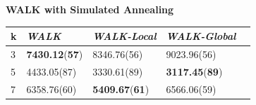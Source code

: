 \documentclass[12pt,a4paper,twoside]{scrartcl}
\numberwithin{equation}{section}
\begin{document}
\clearpage
\textbf{WALK with Simulated Annealing}\\
\begin{table}[H]
\begin{center}
    \begin{tabular}{|l|l|l|l|p{3cm}|}
\hline 
    k &\emph{WALK}&\emph{WALK-Local}&\emph{WALK-Global} \\ \hline      
    3 &\textbf{7430.12}(\textbf{57})&	8346.76(56)	&9023.96(56)  \\ \hline
    5&4433.05(87)	&3330.61(89)	&\textbf{3117.45}(\textbf{89}) \\ \hline
    7&6358.76(60)	&\textbf{5409.67}(\textbf{61})&	6566.06(59) \\ \hline	

\end{tabular}
\end{center}
\end{table} 
\end{document}
